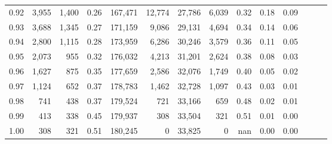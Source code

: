 \begin{tabular}{rrrrrrrrrrrrrr}
0.92 &  3,955 &  1,400 &  0.26 &  167,471 &   12,774 &  27,786 &   6,039 &  0.32 &  0.18 &      0.09 \\
0.93 &  3,688 &  1,345 &  0.27 &  171,159 &    9,086 &  29,131 &   4,694 &  0.34 &  0.14 &      0.06 \\
0.94 &  2,800 &  1,115 &  0.28 &  173,959 &    6,286 &  30,246 &   3,579 &  0.36 &  0.11 &      0.05 \\
0.95 &  2,073 &    955 &  0.32 &  176,032 &    4,213 &  31,201 &   2,624 &  0.38 &  0.08 &      0.03 \\
0.96 &  1,627 &    875 &  0.35 &  177,659 &    2,586 &  32,076 &   1,749 &  0.40 &  0.05 &      0.02 \\
0.97 &  1,124 &    652 &  0.37 &  178,783 &    1,462 &  32,728 &   1,097 &  0.43 &  0.03 &      0.01 \\
0.98 &    741 &    438 &  0.37 &  179,524 &      721 &  33,166 &     659 &  0.48 &  0.02 &      0.01 \\
0.99 &    413 &    338 &  0.45 &  179,937 &      308 &  33,504 &     321 &  0.51 &  0.01 &      0.00 \\
1.00 &    308 &    321 &  0.51 &  180,245 &        0 &  33,825 &       0 &   nan &  0.00 &      0.00 \\
\bottomrule
\end{tabular}
